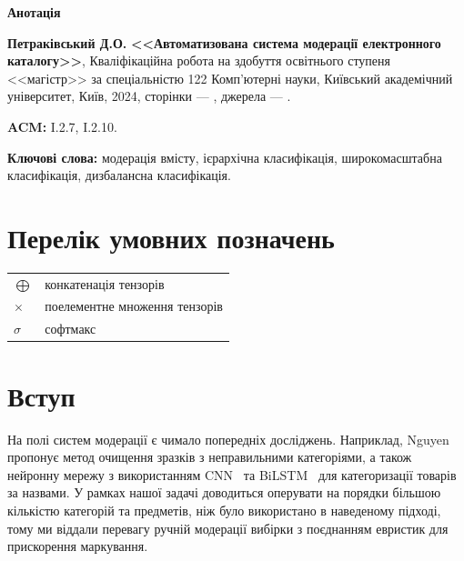 \documentclass[fleqn,12pt,a4paper]{report}
\theoremstyle{plain}
\theoremstyle{definition}
\numberwithin{equation}{chapter}
\numberwithin{figure}{chapter}
\numberwithin{table}{chapter}
\numberwithin{footnote}{chapter}
\numberwithin{figure}{chapter}
\numberwithin{theorem}{chapter}
\numberwithin{definition}{chapter}
\begin{document}
    \begin{center}
        \Large \textbf{Анотація}
    \end{center}
    \noindent
    \textbf{Петраківський Д.О.} \textbf{<<Автоматизована система модерації електронного каталогу>>}, Кваліфікаційна
    робота на здобуття освітнього ступеня <<магістр>> за спеціальністю 122 Комп'ютерні науки, Київський академічний
    університет, Київ, 2024, сторінки --- \ztotpages, джерела --- .

    \bigskip
    \noindent
    \textbf{ACM:} I.2.7, I.2.10.

    \bigskip
    \noindent
    \textbf{Ключові слова:} модерація вмісту, ієрархічна класифікація, широкомасштабна класифікація, дизбалансна
    класифікація.

    \newpage
    \tableofcontents

    \newpage
    \chapter*{Перелік умовних позначень}\label{ch:conventions}

    \bigskip
    \begin{tabular}{ll}
        $\bigoplus$ & конкатенація тензорів         \\
        $\times$    & поелементне множення тензорів \\
        $\sigma$    & софтмакс
    \end{tabular}

    \newpage
    \listoffigures

    \newpage
    \chapter*{Вступ}\label{ch:introduction}

    На полі систем модерації є чимало попередніх досліджень.
    Наприклад, Nguyen~\cite{Nguyen2022} пропонує метод очищення зразків з неправильними категоріями, а також нейронну
    мережу з використанням CNN~\cite{Lecun1998} та BiLSTM~\cite{Schuster1997} для категоризації товарів за назвами.
    У рамках нашої задачі доводиться оперувати на порядки більшою кількістю категорій та предметів, ніж було
    використано в наведеному підході, тому ми віддали перевагу ручній модерації вибірки з поєднанням евристик для
    прискорення маркування.
\end{document}
